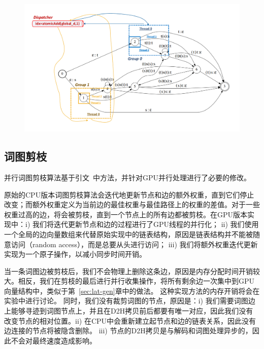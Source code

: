 \begin{figure}[htb]
  \centering
    \captionstyle{\centering}
    \includegraphics[width=\textwidth]{figure/load-balance.pdf}
\end{figure}

\subsection{词图剪枝}

并行词图剪枝算法基于引文~\cite{ljolje1999efficient,povey2012generating}中方法，并针对GPU并行处理进行了必要的修改。

原始的CPU版本词图剪枝算法会迭代地更新节点和边的额外权重，直到它们停止改变；而额外权重定义为当前边的最佳权重与最佳路径上的权重的差值。对于一些权重过高的边，将会被剪枝，直到一个节点上的所有边都被剪枝。在GPU版本实现中：i) 我们将迭代更新节点和边的过程进行了GPU线程的并行化；
ii) 我们使用一个全局的边向量数组来代替原始实现中的链表结构，原因是链表结构并不能被随意访问（random access），而是总要从头进行访问；
iii) 我们将额外权重迭代更新实现为一个原子操作，以减小同步时间开销。

 当一条词图边被剪枝后，我们不会物理上删除这条边，原因是内存分配时间开销较大。相反，我们在剪枝的最后进行并行收集操作，将所有剩余边一次集中到GPU向量结构中，类似于第~\ref{sec:lat-gen}章中的做法。 这种实现方法的内存开销将会在实验中进行讨论。
同时，我们没有裁剪词图的节点，原因是：i) 我们需要词图边上能够寻迹到词图节点上，并且在D2H拷贝前后都要有唯一对应，因此我们没有改变节点的相对位置。ii) 在CPU中会重新建立起节点和边的链表关系，因此没有边连接的节点将被隐含删除。 iii)  节点的D2H拷贝是与解码和词图处理异步的，因此不会对最终速度造成影响。

